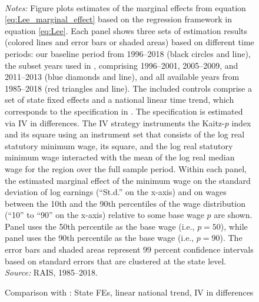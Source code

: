 \begin{figure}[!htb]
  \centering
  \caption{Comparison with \citet{Haanwinckel2020_appendix}: State FEs, linear national trend, IV in differences\label{app_fig_haanwinckel_state_trend_1_ntrend_2_iv_diff}}
  \prefigvspace
  \hspace*{\fill}%
  \centerhfill[\qquad\qquad\qquad\qquad\qquad]
  \hspace*{\fill}
  \\
  \postfigvspace
  \begin{minipage}[t]{1\columnwidth}%
    \begin{spacing}{0.75}
      \emph{\scriptsize{}Notes:}{\scriptsize{} Figure plots estimates of the marginal effects from equation \eqref{eq:Lee_marginal_effect} based on the regression framework in equation \eqref{eq:Lee}. Each panel shows three sets of estimation results (colored lines and error bars or shaded areas) based on different time periods: our baseline period from 1996--2018 (black circles and line), the subset years used in , comprising 1996--2001, 2005--2009, and 2011--2013 (blue diamonds and line), and all available years from 1985--2018 (red triangles and line). The included controls comprise a set of state fixed effects and a national linear time trend, which corresponds to the specification in . The specification is estimated via IV in differences. The IV strategy instruments the Kaitz-$p$ index and its square using an instrument set that consists of the log real statutory minimum wage, its square, and the log real statutory minimum wage interacted with the mean of the log real median wage for the region over the full sample period. Within each panel, the estimated marginal effect of the minimum wage on the standard deviation of log earnings (``St.d.'' on the x-axis) and on wages between the 10th and the 90th percentiles of the wage distribution (``10'' to ``90'' on the x-axis) relative to some base wage $p$ are shown. Panel  uses the 50th percentile as the base wage (i.e., $p=50$), while panel  uses the 90th percentile as the base wage (i.e., $p=90$). The error bars and shaded areas represent 99 percent confidence intervals based on standard errors that are clustered at the state level. %
      \emph{\scriptsize{}Source: } RAIS, 1985--2018.}
    \end{spacing}
  \end{minipage}
\end{figure}


